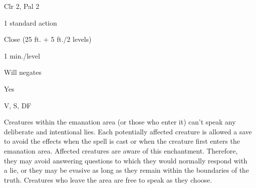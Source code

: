 
\begin{description*}
\item[Level:] Clr 2, Pal 2
\item[Casting Time:] 1 standard action
\item[Range:] Close (25 ft. + 5 ft./2 levels)
\item[Duration:] 1 min./level
\item[Saving Throw:] Will negates
\item[Spell Resistance:] Yes
\item[Components:] V, S, DF
\end{description*}

Creatures within the emanation area (or those who enter it) can't speak any deliberate
and intentional lies. Each potentially affected creature is allowed a save to avoid
the effects when the spell is cast or when the creature first enters the emanation
area. Affected creatures are aware of this enchantment. Therefore, they may avoid
answering questions to which they would normally respond with a lie, or they may
be evasive as long as they remain within the boundaries of the truth. Creatures
who leave the area are free to speak as they choose.